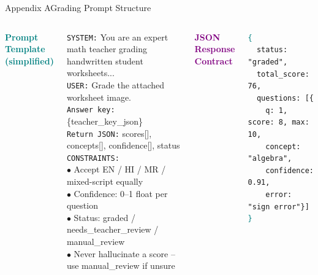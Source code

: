 \begin{frame}[t,shrink=5]{Appendix A}{Grading Prompt Structure}
\begin{columns}[T]

\vspace{4pt}
\textcolor{teal}{\small\textbf{Prompt Template (simplified)}}\\[5pt]
\colorbox{card}{\parbox{0.92\linewidth}{%
  \vspace{4pt}
  \textcolor{teallt}{\scriptsize\texttt{SYSTEM:}}\;
  \textcolor{txtsec}{\scriptsize You are an expert math teacher grading handwritten student worksheets...}\\[4pt]
  \textcolor{teallt}{\scriptsize\texttt{USER:}}\;
  \textcolor{txtsec}{\scriptsize Grade the attached worksheet image.}\\[3pt]
  \textcolor{txtsec}{\scriptsize\texttt{Answer key:} \{teacher\_key\_json\}}\\[3pt]
  \textcolor{txtsec}{\scriptsize\texttt{Return JSON:} scores[], concepts[], confidence[], status}\\[4pt]
  \textcolor{teallt}{\scriptsize\texttt{CONSTRAINTS:}}\\
  \textcolor{txtsec}{\scriptsize$\bullet$} Accept EN / HI / MR / mixed-script equally\\[2pt]
  \textcolor{txtsec}{\scriptsize$\bullet$} Confidence: 0--1 float per question\\[2pt]
  \textcolor{txtsec}{\scriptsize$\bullet$} Status: graded / needs\_teacher\_review / manual\_review\\[2pt]
  \textcolor{txtsec}{\scriptsize$\bullet$} Never hallucinate a score -- use manual\_review if unsure\\[4pt]
}}

\vspace{4pt}
\textcolor{purple}{\small\textbf{JSON Response Contract}}\\[5pt]
\colorbox{card}{\parbox{0.92\linewidth}{%
  \vspace{4pt}
  \textcolor{teal}{\scriptsize\texttt{\{}}\\
  \textcolor{txtsec}{\scriptsize\texttt{~~status: "graded",}}\\
  \textcolor{txtsec}{\scriptsize\texttt{~~total\_score: 76,}}\\
  \textcolor{txtsec}{\scriptsize\texttt{~~questions: [\{}}\\
  \textcolor{txtsec}{\scriptsize\texttt{~~~~q: 1, score: 8, max: 10,}}\\
  \textcolor{txtsec}{\scriptsize\texttt{~~~~concept: "algebra",}}\\
  \textcolor{txtsec}{\scriptsize\texttt{~~~~confidence: 0.91,}}\\
  \textcolor{txtsec}{\scriptsize\texttt{~~~~error: "sign error"\}]}}\\
  \textcolor{teal}{\scriptsize\texttt{\}}}\\[4pt]
}}
\vspace{5pt}


\end{columns}
\end{frame}

